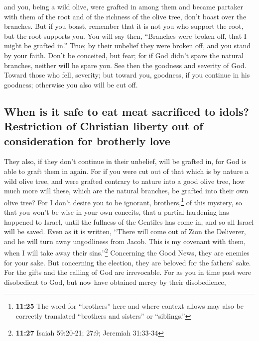 and you, being a wild olive, were grafted in among them and became
partaker with them of the root and of the richness of the olive tree,
 don't boast over the branches. But if you boast,
remember that it is not you who support the root, but the root supports
you.  You will say then, ``Branches were broken off, that
I might be grafted in.''  True; by their unbelief they
were broken off, and you stand by your faith. Don't be conceited, but
fear;  for if God didn't spare the natural branches,
neither will he spare you.  See then the goodness and
severity of God. Toward those who fell, severity; but toward you,
goodness, if you continue in his goodness; otherwise you also will be
cut off.

\hypertarget{when-is-it-safe-to-eat-meat-sacrificed-to-idols-restriction-of-christian-liberty-out-of-consideration-for-brotherly-love}{%
\subsection{When is it safe to eat meat sacrificed to idols? Restriction
of Christian liberty out of consideration for brotherly
love}\label{when-is-it-safe-to-eat-meat-sacrificed-to-idols-restriction-of-christian-liberty-out-of-consideration-for-brotherly-love}}

 They also, if they don't continue in their unbelief,
will be grafted in, for God is able to graft them in again.
 For if you were cut out of that which is by nature a
wild olive tree, and were grafted contrary to nature into a good olive
tree, how much more will these, which are the natural branches, be
grafted into their own olive tree?  For I don't desire
you to be ignorant, brothers,\footnote{\textbf{11:25} The word for
  ``brothers'' here and where context allows may also be correctly
  translated ``brothers and sisters'' or ``siblings.''} of this mystery,
so that you won't be wise in your own conceits, that a partial hardening
has happened to Israel, until the fullness of the Gentiles has come in,
 and so all Israel will be saved. Even as it is written,
``There will come out of Zion the Deliverer, and he will turn away
ungodliness from Jacob.  This is my covenant with them,
when I will take away their sins.''\footnote{\textbf{11:27} Isaiah
  59:20-21; 27:9; Jeremiah 31:33-34}  Concerning the Good
News, they are enemies for your sake. But concerning the election, they
are beloved for the fathers' sake.  For the gifts and the
calling of God are irrevocable.  For as you in time past
were disobedient to God, but now have obtained mercy by their
disobedience,

